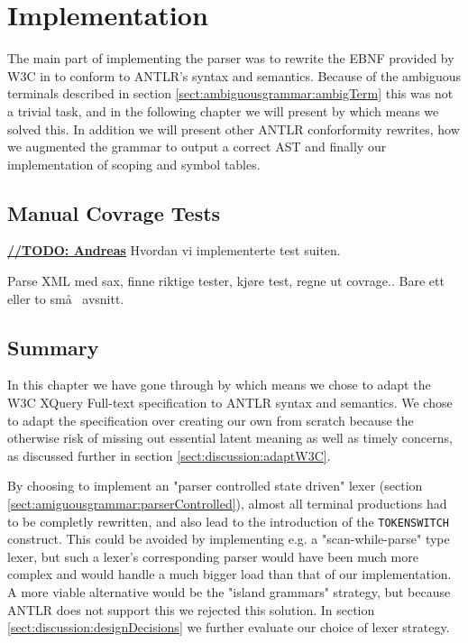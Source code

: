 \chapter{Implementation}


The main part of implementing the parser was to rewrite the EBNF provided by W3C in \cite{w3c01} to conform to ANTLR's syntax and semantics. Because of the ambiguous terminals described in section \ref{sect:ambiguousgrammar:ambigTerm} this was not a trivial task, and in the following chapter we will present by which means we solved this. In addition we will present other ANTLR conforformity rewrites, how we augmented the grammar to output a correct AST and finally our implementation of scoping and symbol tables.









\section{Manual Covrage Tests}
\underline{\textbf{\LARGE //TODO: Andreas}} 
Hvordan vi implementerte test suiten. 

Parse XML med sax, finne riktige tester, kj\o re test, regne ut covrage.. Bare ett eller to sm\aa~ avsnitt.

\section{Summary}
In this chapter we have gone through by which means we chose to adapt the W3C XQuery Full-text specification to ANTLR syntax and semantics. We chose to adapt the specification over creating our own from scratch because the otherwise risk of missing out essential latent meaning as well as timely concerns, as discussed further in section \ref{sect:discussion:adaptW3C}.

By choosing to implement an "parser controlled state driven" lexer (section \ref{sect:amiguousgrammar:parserControlled}), almost all terminal productions had to be completly rewritten, and also lead to the introduction of the \verb!TOKENSWITCH! construct. This could be avoided by implementing e.g. a "scan-while-parse" type lexer, but such a lexer's corresponding parser would have been much more complex and would handle a much bigger load than that of our implementation. A more viable alternative would be the "island grammars" strategy, but because ANTLR does not support this we rejected this solution. In section \ref{sect:discussion:designDecisions} we further evaluate our choice of lexer strategy.

